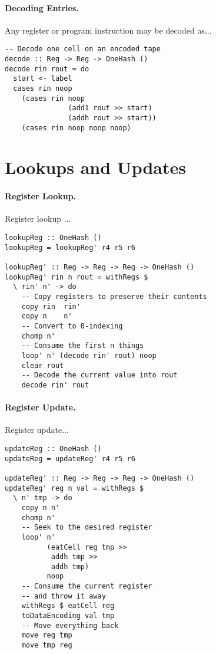 \documentclass[10pt, preprint, nocopyrightspace]{sigplanconf}
\begin{document}
\paragraph{Decoding Entries.}

Any register or program instruction may be decoded as...

\begin{lstlisting}
-- Decode one cell on an encoded tape
decode :: Reg -> Reg -> OneHash ()
decode rin rout = do
  start <- label
  cases rin noop
    (cases rin noop 
               (add1 rout >> start) 
               (addh rout >> start))
    (cases rin noop noop noop)
\end{lstlisting}

\section{Lookups and Updates}

\paragraph{Register Lookup.}

Register lookup ...

\begin{lstlisting}
lookupReg :: OneHash ()
lookupReg = lookupReg' r4 r5 r6

lookupReg' :: Reg -> Reg -> Reg -> OneHash ()
lookupReg' rin n rout = withRegs $ 
  \ rin' n' -> do
    -- Copy registers to preserve their contents
    copy rin  rin'
    copy n    n'
    -- Convert to 0-indexing
    chomp n'
    -- Consume the first n things
    loop' n' (decode rin' rout) noop
    clear rout
    -- Decode the current value into rout
    decode rin' rout
\end{lstlisting}

\paragraph{Register Update.}

Register update...

\begin{lstlisting}
updateReg :: OneHash ()
updateReg = updateReg' r4 r5 r6

updateReg' :: Reg -> Reg -> Reg -> OneHash ()
updateReg' reg n val = withRegs $ 
  \ n' tmp -> do
    copy n n'
    chomp n'
    -- Seek to the desired register
    loop' n' 
          (eatCell reg tmp >> 
           addh tmp >> 
           addh tmp) 
          noop
    -- Consume the current register 
    -- and throw it away
    withRegs $ eatCell reg
    toDataEncoding val tmp
    -- Move everything back
    move reg tmp
    move tmp reg
\end{lstlisting}
\end{document}
